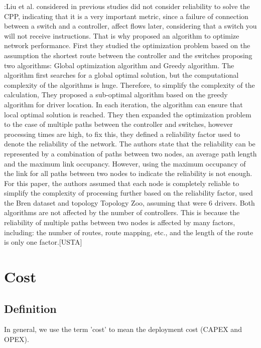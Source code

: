 \documentclass[a4paper,10pt]{article}
\begin{document}
\cite{LiLi16}:Liu et al. considered in previous studies did not consider reliability to solve the CPP, indicating that it is a very important metric, since a failure of connection between a switch and a controller, affect flows later, considering that a switch you will not receive instructions. That is why proposed an algorithm to optimize network performance. First they studied the optimization problem based on the assumption the shortest route between the controller and the switches proposing two algorithms: Global optimization algorithm and Greedy algorithm. The algorithm first searches for a global optimal solution, but the computational complexity of the algorithms is huge. Therefore, to simplify the complexity of the calculation, They proposed a sub-optimal algorithm based on the greedy algorithm for driver location. In each iteration, the algorithm can ensure that local optimal solution is reached. They then expanded the optimization problem to the case of multiple paths between the controller and switches, however processing times are high, to fix this, they defined a reliability factor used to denote the reliability of the network. The authors state that the reliability can be represented by a combination of paths between two nodes, an average path length and the maximum link occupancy. However, using the maximum occupancy of the link for all paths between two nodes to indicate the reliability is not enough. For this paper, the authors assumed that each node is completely reliable to simplify the complexity of processing further based on the reliability factor, used the Bren dataset and topology Topology Zoo, assuming that were 6 drivers. Both algorithms are not affected by the number of controllers. This is because the reliability of multiple paths between two nodes is affected by many factors, including: the number of routes, route mapping, etc., and the length of the route is only one factor.[USTA]


\section{Cost}
\subsection{Definition}
In general, we use the term 'cost' to mean the deployment cost (CAPEX and OPEX). 

\end{document}
